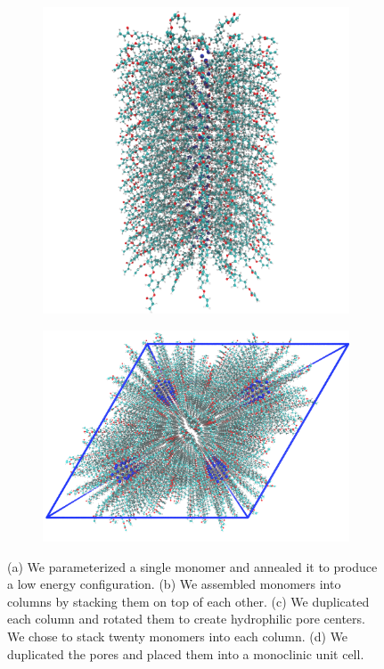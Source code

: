 \documentclass[journal=jpcbfk,manuscript=article]{achemso}
\begin{document}
\begin{figure}[!htb]
\begin{subfigure}[t]{0.42\textwidth}
  \caption{}
  \end{subfigure}
  \begin{subfigure}[t]{0.35\textwidth}
  \includegraphics[width=\linewidth]{initial_pore.png}
  \caption{}
  \end{subfigure}
  \begin{subfigure}[t]{0.45\textwidth}
  \includegraphics[width=\linewidth]{initial_unit_cell.png}
  \caption{}
  \end{subfigure}
  \caption{(a) We parameterized a single monomer and annealed it to produce a low energy
		configuration. (b) We assembled monomers into columns by stacking them on top of each 
		other. (c) We duplicated each column and rotated them to create hydrophilic pore centers.
		We chose to stack twenty monomers into each column. (d) We duplicated the pores and 
		placed them into a monoclinic unit cell.}\label{fig:build_procedure}
  \end{figure}
  
\end{document}
